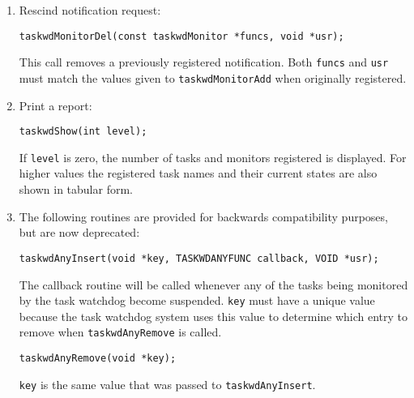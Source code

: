 \begin{enumerate}
\item Rescind notification request:

\begin{verbatim}
taskwdMonitorDel(const taskwdMonitor *funcs, void *usr);
\end{verbatim}

This call removes a previously registered notification. Both \verb|funcs| and \verb|usr| must match the values given to 
\verb|taskwdMonitorAdd| when originally registered.

\item Print a report:

\begin{verbatim}
taskwdShow(int level);
\end{verbatim}

If \verb|level| is zero, the number of tasks and monitors registered is displayed. For higher values the registered task 
names and their current states are also shown in tabular form.

\item The following routines are provided for backwards compatibility purposes, but are now deprecated:

\begin{verbatim}
taskwdAnyInsert(void *key, TASKWDANYFUNC callback, VOID *usr);
\end{verbatim}

The callback routine will be called whenever any of the tasks being monitored by the task watchdog become 
suspended. \verb|key| must have a unique value because the task watchdog system uses this value to determine which 
entry to remove when \verb|taskwdAnyRemove| is called.

\begin{verbatim}
taskwdAnyRemove(void *key);
\end{verbatim}

\verb|key| is the same value that was passed to \verb|taskwdAnyInsert|.

\end{enumerate}
